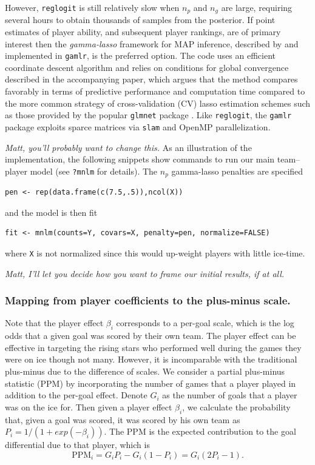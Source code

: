 However, {\tt reglogit} is still relatively slow when $n_p$ and $n_g$ are
large, requiring several hours to obtain thousands of samples from the
posterior.  If point estimates of player ability, and subsequent player
rankings, are of primary interest then the {\em gamma-lasso} framework for MAP
inference, described by \cite{taddy:2012} and implemented in {\tt gamlr}, is
the preferred option. The code uses an efficient coordinate descent algorithm
and relies on conditions for global convergence described in the accompanying
paper, which argues that the method compares favorably in terms of predictive
performance and computation time compared to the more common strategy of
cross-validation (CV) lasso estimation schemes such as those provided by the
popular {\tt glmnet} package
\cite{glmnet}.  Like {\tt reglogit}, the {\tt gamlr} package exploits sparce
matrices via {\tt slam} and OpenMP parallelization.

{\em Matt, you'll probably want to change this.}  As an illustration of the
implementation, the following snippets show commands to run our main
team--player model (see \verb!?mnlm! for details).  
The $n_p$ gamma-lasso penalties are specified 
\begin{verbatim}
pen <- rep(data.frame(c(7.5,.5)),ncol(X))
\end{verbatim}
and the model is then fit
\begin{verbatim}
fit <- mnlm(counts=Y, covars=X, penalty=pen, normalize=FALSE)
\end{verbatim}
where \verb!X! is not normalized since this would up-weight players with little ice-time.

{\em Matt, I'll let you decide how you want to frame our initial results, if at all.}

\subsubsection{Mapping from player coefficients to the plus-minus scale.}
\label{sec:ppm.mapping}
Note that the player effect $\beta_i$ corresponds to a per-goal scale, which is the log odds that a given goal was scored by their own team. The player effect can be effective in targeting the rising stars who performed well during the games they were on ice though not many. However, it is incomparable with the traditional plus-minus due to the difference of scales. We consider a partial plus-minus statistic (PPM) by incorporating the number of games that a player played in addition to the per-goal effect. Denote $G_i$ as the number of goals that a player was on the ice for. Then given a player effect $\beta_i$, we calculate the probability that, given a goal was scored, it was scored by his own team as $P_i=1/(1+exp(-\beta_i))$. The PPM is the expected contribution to the goal differential due to that player, which is 
\begin{equation}
\text{PPM}_i = G_iP_i-G_i(1-P_i)=G_i(2P_i-1).
\label{eq:ppm}
\end{equation}

